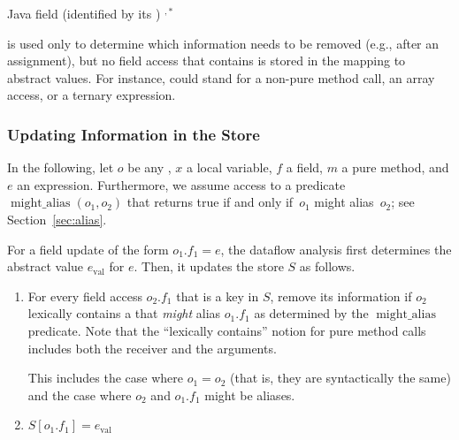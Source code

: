 \begin{bnfgrammar}
        {  \qquad Java field (identified by its )}
        { \qquad {}}
        {  
            \literal{(} $^{,*}$ \literal{)}}
\end{bnfgrammar}

 is used only to determine which
information needs to be removed (e.g., after an assignment), but no field
access that contains  is stored in the mapping to
abstract values.  For instance,  could stand for
a non-pure method call, an array access, or a ternary expression.


\subsubsection{Updating Information in the Store}

\newcommand{\alias}{\operatorname{might\_alias}}

In the following, let $o$ be any , $x$ a local
variable, $f$ a field, $m$ a pure method, and $e$ an expression.
Furthermore, we assume access to a predicate $\alias(o_1,o_2)$
that returns true if and only if~$o_1$ might alias~$o_2$; see
Section~\ref{sec:alias}.


For a field update of the form $o_1.f_1 = e$, the
dataflow analysis first determines the abstract value $e_\text{val}$ for $e$.
Then, it updates the store $S$ as follows.
\begin{enumerate}
    \item For every field access $o_2.f_1$ that is a key in $S$, remove its
      information if
      $o_2$ lexically contains a  that \emph{might}
        alias $o_1.f_1$ as determined by the $\alias$
        predicate.
      Note that the ``lexically contains'' notion for pure method calls
        includes both the receiver and the arguments.

      This includes the case where $o_1 = o_2$ (that is, they are
      syntactically the same) and the case where $o_2$ and $o_1.f_1$ might be
      aliases.

    \item $S[o_1.f_1] = e_\text{val}$
\end{enumerate}


